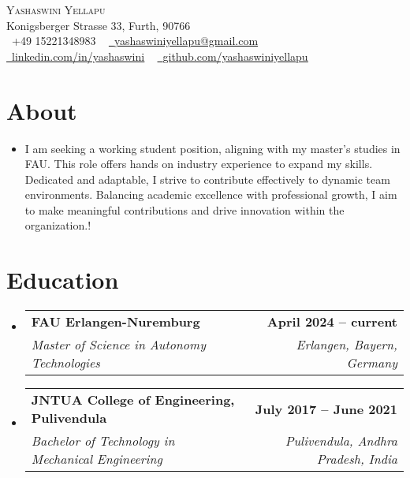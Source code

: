 \documentclass[letterpaper,11pt]{article}
\makeatletter
\newcommand{\resumeItem}[1]{
  \item\small{
    {#1 \vspace{-2pt}}
  }
}
\newcommand{\resumeSubheading}[4]{
  \vspace{-2pt}\item
    \begin{tabular*}{1.0\textwidth}[t]{l@{\extracolsep{\fill}}r}
      \textbf{#1} & \textbf{\small #2} \\
      \textit{\small#3} & \textit{\small #4} \\
    \end{tabular*}\vspace{-7pt}
}
\newcommand{\resumeSubHeadingListStart}{\begin{itemize}[leftmargin=0.0in, label={}]}
\newcommand{\resumeSubHeadingListEnd}{\end{itemize}}
\makeatother
\begin{document}

\begin{center}
  {\Huge \scshape Yashaswini Yellapu} \\ \vspace{1pt}
  Konigsberger Strasse 33, Furth, 90766 \\ \vspace{1pt}
  \small \raisebox{-0.1\height}\faPhone\ +49 15221348983 ~ \href{mailto:yashaswiniyellapu@gmail.com}{\raisebox{-0.2\height}\faEnvelope\  \underline{yashaswiniyellapu@gmail.com}} ~
  \href{https://www.linkedin.com/in/yashaswini-y-200500149/}{\raisebox{-0.2\height}\faLinkedin\ \underline{linkedin.com/in/yashaswini}}  ~
  \href{https://github.com/yashaswiniyellapu}{\raisebox{-0.2\height}\faGithub\ \underline{github.com/yashaswiniyellapu}}
  \vspace{-8pt}
\end{center}

\section{About}
\resumeSubHeadingListStart
\resumeItem{I am seeking a working student position, aligning with my master's studies in FAU. This role offers hands
  on industry experience to expand my skills. Dedicated and adaptable, I strive to contribute effectively to
  dynamic team environments. Balancing academic excellence with professional growth, I aim to make
  meaningful contributions and drive innovation within the organization.!}
\resumeSubHeadingListEnd
\vspace{-16pt}

\section{Education}
\resumeSubHeadingListStart
\resumeSubheading
{FAU Erlangen-Nuremburg}{April 2024 -- current}
{Master of Science in Autonomy Technologies}{Erlangen, Bayern, Germany}
\resumeSubheading
{JNTUA College of Engineering, Pulivendula}{July 2017 -- June 2021}
{Bachelor of Technology in Mechanical Engineering}{Pulivendula, Andhra Pradesh, India}
\resumeSubHeadingListEnd
\end{document}
